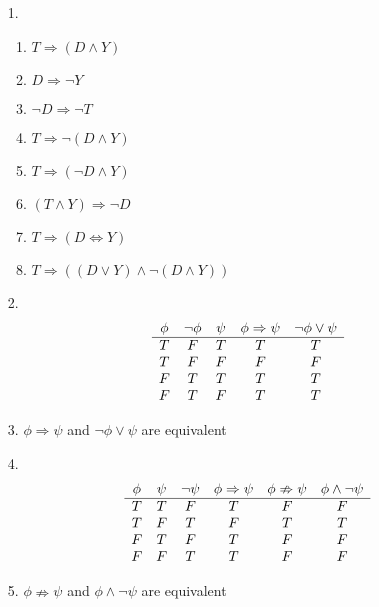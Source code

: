 \documentclass[11pt]{exam}
\author{@dante}
\begin{document}

\begin{enumerate}[leftmargin=0pt]

\item[1.]
\begin{enumerate}[label=(\alph*)]
    \item $T \Rightarrow (D \land Y)$
    \item $D \Rightarrow \neg Y$
    \item $\neg D \Rightarrow \neg T$
    \item $T \Rightarrow \neg(D \land Y)$
    \item $T \Rightarrow (\neg D \land Y)$
    \item $(T \land Y) \Rightarrow \neg D$
    \item $T \Rightarrow (D \Leftrightarrow Y)$
    \item $T \Rightarrow ((D \lor Y) \land \neg(D \land Y))$
\end{enumerate}

\item[2.]
\begin{displaymath}
\begin{array}{c c c c c}
\phi & \neg \phi & \psi & \phi \Rightarrow \psi & \neg \phi \lor \psi \\
\hline
T & F & T & T & T \\
T & F & F & F & F \\
F & T & T & T & T \\
F & T & F & T & T \\
\end{array}
\end{displaymath}

\item[3.] $\phi \Rightarrow \psi$ and $\neg \phi \lor \psi$ are equivalent

\item[4.]
\begin{displaymath}
\begin{array}{c c c c c c}
\phi & \psi & \neg \psi & \phi \Rightarrow \psi & \phi \nRightarrow \psi & \phi \land \neg \psi \\
\hline
T & T & F & T & F & F \\
T & F & T & F & T & T\\
F & T & F & T & F & F\\
F & F & T & T & F & F\\
\end{array}
\end{displaymath}

\item[5.] $\phi \nRightarrow \psi$ and $\phi \land \neg \psi$ are equivalent

\end{enumerate}
\end{document}
